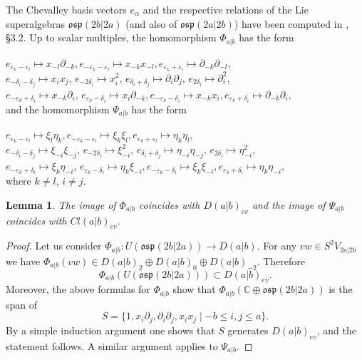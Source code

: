 \documentclass[12pt]{amsart}
\makeatletter
\def\@putname#1#2#3#4{\def\@@ref{#3}\let\old@bf\bf
        \def\bf##1{\old@bf\if?\noexpand##1?{#4}\else##1\fi}%
	#1{#2}%
        \let\bf\old@bf}
\def\@putname#1#2#3#4{\def\@@ref{#3}\let\old@bf\bf	%
	\let\old@reset@font\reset@font			%
        \def\bf##1{\old@bf\if?\noexpand##1?{#4}\else##1\fi}%
	\def\reset@font##1##2{\old@reset@font##1\if?\noexpand##2?{#4}\else##2\fi}#1{#2}%
        \let\bf\old@bf\let\reset@font\old@reset@font}
\let\my@cite=\cite
\def\cite#1{\@putname\my@cite{#1}{\@citeb}{\tiny\rm\@@ref}}
\theoremstyle{plain} %
\numberwithin{equation}{section}
\theoremstyle{definition}
\theoremstyle{remark}
\theoremstyle{plain} %
\newtheorem{lemma}[definition]{Lemma}
\newcommand{\osp}{\mathfrak{osp}}
\makeatother
\begin{document}
The Chevalley basis vectors $e_{\alpha}$ and the respective relations of the Lie superalgebras $\osp(2b|2a)$  (and also of $\osp(2a|2b)$) have been computed in \cite{FG},  \S 3.2. Up to scalar multiples, 
 the homomorphism $\Phi_{a|b}$ has the form 
 
\noindent $e_{\varepsilon_k  - \varepsilon_l } \mapsto x_{-l} \partial_{-k}, e_{-\varepsilon_k - \varepsilon_l }  \mapsto x_{-k} x_{-l}, e_{\varepsilon_k  + \varepsilon_l} \mapsto \partial_{-k} \partial_{-l} $, \\
$e_{-\delta_i - \delta_j} \mapsto x_{i}x_{j}$, $e_{-2\delta_i} \mapsto x_{i}^2$, $e_{\delta_{i} + \delta_{j}} \mapsto \partial_{i}\partial_{j}$, $e_{2\delta_i} \mapsto \partial_{i}^2$,\\
$e_{-\varepsilon_k + \delta_i} \mapsto x_{-k}\partial_{i}$, $e_{\varepsilon_k - \delta_i} \mapsto x_{i}\partial_{-k},  e_{-\varepsilon_k - \delta_i} \mapsto x_{-k} x_i, e_{\varepsilon_k + \delta_i} \mapsto \partial_{-k} \partial_{i},$ \\



\noindent and the homomorphism $\Psi_{a|b}$ has the form


\noindent $e_{\varepsilon_k  - \varepsilon_l } \mapsto \xi_{l} \eta_{k}, e_{-\varepsilon_k - \varepsilon_l }  \mapsto \xi_{k} \xi_{l}, e_{\varepsilon_k  + \varepsilon_l} \mapsto \eta_{k} \eta_{l}$, \\
$e_{-\delta_i - \delta_j} \mapsto \xi_{-i}\xi_{-j}$, $e_{-2\delta_i} \mapsto \xi_{-i}^2$, $e_{\delta_{i} + \delta_{j}} \mapsto \eta_{-i}\eta_{-j}$, $e_{2\delta_i} \mapsto \eta_{-i}^2$,\\
$e_{-\varepsilon_k + \delta_i} \mapsto \xi_{k}\eta_{-i}$, $e_{\varepsilon_k - \delta_i} \mapsto \eta_{k}\xi_{-i}, e_{-\varepsilon_k - \delta_i} \mapsto \xi_k\xi_{-i}, e_{\varepsilon_k + \delta_i} \mapsto \eta_k\eta_{-i},$ \\




\noindent  where $k\neq l$, $i \neq j$. 

\begin{lemma}\label{homomorphisms_Lie} The image of $\Phi_{a|b}$ coincides with $D(a|b)_{ev}$ and the image of $\Psi_{a|b}$ coincides with $Cl(a|b)_{ev}$.
  \end{lemma}
  \begin{proof} Let us consider $\Phi_{a|b}:U(\osp(2b|2a))\to D(a|b)$. For any $vw\in S^2 V_{2a|2b} $ we have $\Phi_{a|b}(vw)\in D(a|b)_2\oplus D(a|b)_0\oplus D(a|b)_{-2}$. Therefore
      $$\Phi_{a|b}(U(\osp(2b|2a)))\subset D(a|b)_{ev}.$$
      Moreover, the above formulas for  $\Phi_{a|b}$ show that $\Phi_{a|b}(\mathbb C\oplus \osp(2b|2a))$ is the span of $$S=\{1,x_i\partial_j,\partial_i\partial_j,x_ix_j\mid -b \leq i,j \leq a\}.$$ By a simple induction argument one  shows that $S$ generates $D(a|b)_{ev}$, and the statement follows. A similar argument applies  to $\Psi_{a|b}$. 
    \end{proof}
\end{document}

